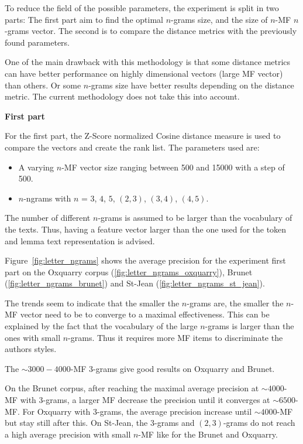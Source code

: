 To reduce the field of the possible parameters, the experiment is split in two parts:
The first part aim to find the optimal $n$-grams size, and the size of $n$-MF $n$-grams vector.
The second is to compare the distance metrics with the previously found parameters.

One of the main drawback with this methodology is that some distance metrics can have better performance on highly dimensional vectors (large MF vector) than others.
Or some $n$-grams size have better results depending on the distance metric.
The current methodology does not take this into account.

\textbf{First part}

For the first part, the Z-Score normalized Cosine distance measure is used to compare the vectors and create the rank list.
The parameters used are:

\begin{itemize}
  \item
  A varying $n$-MF vector size ranging between 500 and 15000 with a step of 500.
  \item
  $n$-ngrams with $n$ = $3$, $4$, $5$, $(2, 3)$, $(3, 4)$, $(4, 5)$.
\end{itemize}

The number of different $n$-grams is assumed to be larger than the vocabulary of the texts.
Thus, having a feature vector larger than the one used for the token and lemma text representation is advised.

Figure~\ref{fig:letter_ngrams} shows the average precision for the experiment first part on the Oxquarry corpus (\ref{fig:letter_ngrams_oxquarry}), Brunet (\ref{fig:letter_ngrams_brunet}) and St-Jean (\ref{fig:letter_ngrams_st_jean}).

The trends seem to indicate that the smaller the $n$-grams are, the smaller the $n$-MF vector need to be to converge to a maximal effectiveness.
This can be explained by the fact that the vocabulary of the large $n$-grams is larger than the ones with small $n$-grams.
Thus it requires more MF items to discriminate the authors styles.

The $\sim 3000-4000$-MF $3$-grams give good results on Oxquarry and Brunet.

On the Brunet corpus, after reaching the maximal average precision at $\sim 4000$-MF with $3$-grams, a larger MF decrease the precision until it converges at $\sim 6500$-MF.
For Oxquarry with $3$-grams, the average precision increase until $\sim 4000$-MF but stay still after this.
On St-Jean, the $3$-grams and $(2,3)$-grams do not reach a high average precision with small $n$-MF like for the Brunet and Oxquarry.

